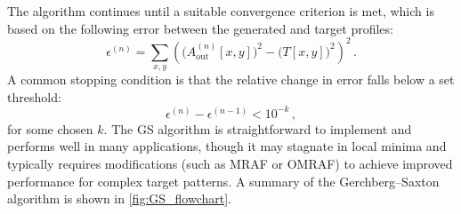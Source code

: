 \documentclass[../Thesis-IJspeert.tex]{subfiles}
\begin{document}
The algorithm continues until a suitable convergence criterion is met, which is based on the following error between the generated and target profiles:
\begin{equation}
\label{costfunction}
\epsilon^{(n)} =  \sum_{x,y} \left( \Big( A_{\mathrm{out}}^{(n)}[x,y] \Big)^{\!2} - \Big( T[x,y] \Big)^{\!2} \right)^{\!2} \,.
\end{equation}
A common stopping condition is that the relative change in error falls below a set threshold:
\begin{equation}
\label{convergence}
\epsilon^{(n)} - \epsilon^{(n-1)} < 10^{-k}\,,
\end{equation}
for some chosen $k$. The GS algorithm is straightforward to implement and performs well in many applications, though it may stagnate in local minima and typically requires modifications (such as MRAF or OMRAF) to achieve improved performance for complex target patterns. A summary of the Gerchberg--Saxton algorithm is shown in \autoref{fig:GS_flowchart}.
\end{document}

